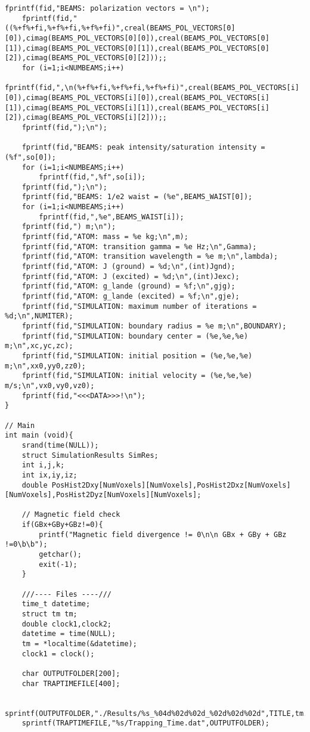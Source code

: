 \begin{lstlisting}[style=CStyle]
    fprintf(fid,"BEAMS: polarization vectors = \n");
    fprintf(fid,"((%+f%+fi,%+f%+fi,%+f%+fi)",creal(BEAMS_POL_VECTORS[0][0]),cimag(BEAMS_POL_VECTORS[0][0]),creal(BEAMS_POL_VECTORS[0][1]),cimag(BEAMS_POL_VECTORS[0][1]),creal(BEAMS_POL_VECTORS[0][2]),cimag(BEAMS_POL_VECTORS[0][2]));;
    for (i=1;i<NUMBEAMS;i++)
        fprintf(fid,",\n(%+f%+fi,%+f%+fi,%+f%+fi)",creal(BEAMS_POL_VECTORS[i][0]),cimag(BEAMS_POL_VECTORS[i][0]),creal(BEAMS_POL_VECTORS[i][1]),cimag(BEAMS_POL_VECTORS[i][1]),creal(BEAMS_POL_VECTORS[i][2]),cimag(BEAMS_POL_VECTORS[i][2]));;
    fprintf(fid,");\n");

    fprintf(fid,"BEAMS: peak intensity/saturation intensity = (%f",so[0]);
    for (i=1;i<NUMBEAMS;i++)
        fprintf(fid,",%f",so[i]);
    fprintf(fid,");\n");
    fprintf(fid,"BEAMS: 1/e2 waist = (%e",BEAMS_WAIST[0]);
    for (i=1;i<NUMBEAMS;i++)
        fprintf(fid,",%e",BEAMS_WAIST[i]);
    fprintf(fid,") m;\n");
    fprintf(fid,"ATOM: mass = %e kg;\n",m);
    fprintf(fid,"ATOM: transition gamma = %e Hz;\n",Gamma);
    fprintf(fid,"ATOM: transition wavelength = %e m;\n",lambda);
    fprintf(fid,"ATOM: J (ground) = %d;\n",(int)Jgnd);
    fprintf(fid,"ATOM: J (excited) = %d;\n",(int)Jexc);
    fprintf(fid,"ATOM: g_lande (ground) = %f;\n",gjg);
    fprintf(fid,"ATOM: g_lande (excited) = %f;\n",gje);
    fprintf(fid,"SIMULATION: maximum number of iterations = %d;\n",NUMITER);
    fprintf(fid,"SIMULATION: boundary radius = %e m;\n",BOUNDARY);
    fprintf(fid,"SIMULATION: boundary center = (%e,%e,%e) m;\n",xc,yc,zc);
    fprintf(fid,"SIMULATION: initial position = (%e,%e,%e) m;\n",xx0,yy0,zz0);
    fprintf(fid,"SIMULATION: initial velocity = (%e,%e,%e) m/s;\n",vx0,vy0,vz0);
    fprintf(fid,"<<<DATA>>>!\n");
}

// Main
int main (void){
    srand(time(NULL));
    struct SimulationResults SimRes;
    int i,j,k;
    int ix,iy,iz;
    double PosHist2Dxy[NumVoxels][NumVoxels],PosHist2Dxz[NumVoxels][NumVoxels],PosHist2Dyz[NumVoxels][NumVoxels];

    // Magnetic field check
    if(GBx+GBy+GBz!=0){
        printf("Magnetic field divergence != 0\n\n GBx + GBy + GBz !=0\b\b");
        getchar();
        exit(-1);
    }

    ///---- Files ----///
    time_t datetime;
    struct tm tm;
    double clock1,clock2;
    datetime = time(NULL);
    tm = *localtime(&datetime);
    clock1 = clock();

    char OUTPUTFOLDER[200];
    char TRAPTIMEFILE[400];

    sprintf(OUTPUTFOLDER,"./Results/%s_%04d%02d%02d_%02d%02d%02d",TITLE,tm.tm_year+1900,tm.tm_mon+1,tm.tm_mday,tm.tm_hour,tm.tm_min,tm.tm_sec);
    sprintf(TRAPTIMEFILE,"%s/Trapping_Time.dat",OUTPUTFOLDER);


\end{lstlisting}
